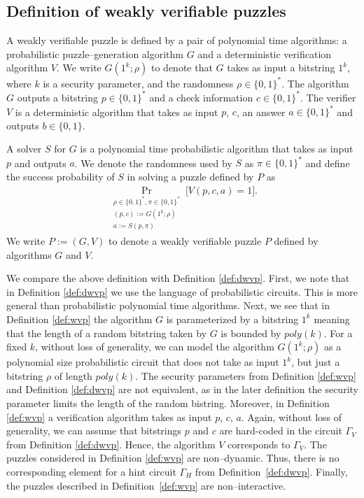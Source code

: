 \subsection{Definition of weakly verifiable puzzles}
\begin{definition}
  \label{def:wvp}
A \textnormal{weakly verifiable puzzle} is defined by a pair of polynomial time algorithms:
a probabilistic puzzle--generation algorithm $G$ and a deterministic verification algorithm $V$.
We write $G(1^k; \rho)$ to denote that $G$ takes as input a bitstring $1^k$, where $k$ is a security parameter,
and the randomness $\rho \in \{0,1\}^{*}$.
The algorithm $G$ outputs a bitstring $p \in \{0,1\}^{*}$ and a check information $c \in \{0,1\}^{*}$.
The \textnormal{verifier} $V$ is a deterministic algorithm that takes as input $p$, $c$, an answer $a \in \{0,1\}^{*}$
and outputs $b \in \{0,1\}$.

A \textnormal{solver} $S$ for $G$ is a polynomial time probabilistic algorithm that
takes as input $p$ and outputs $a$. We denote the randomness used by $S$ as $\pi \in \{0,1\}^{*}$
and define the \textnormal{success probability} of $S$ in solving a puzzle defined by $P$ as
\begin{align*}
  \underset{\substack{\rho \in \{0,1\}^{*}, \pi \in \{0,1\}^{*} \\ (p,c):=G(1^k; \rho) \\ a := S(p, \pi)}}{\Pr}\Big[ V(p,c,a) = 1\Big].
\end{align*}
We write $P := (G,V)$ to denote a weakly verifiable puzzle $P$ defined by algorithms $G$ and $V$.
\end{definition}
We compare the above definition with Definition \ref{def:dwvp}.
First, we note that in Definition \ref{def:dwvp} we use the language of probabilistic circuits.
This is more general than probabilistic polynomial time algorithms.
Next, we see that in Definition \ref{def:wvp} the algorithm $G$ is parameterized by
a bitstring $1^k$ meaning that the length of a random bitstring taken by $G$ is bounded by $poly(k)$.
For a fixed $k$, without loss of generality, we can model the algorithm $G(1^k; \rho)$ as a polynomial size probabilistic circuit
that does not take as input $1^k$, but just a bitstring $\rho$ of length $\mathit{poly}(k)$.
The security parameters from Definition \ref{def:wvp} and Definition \ref{def:dwvp} are not equivalent,
as in the later definition the security parameter limits the length of the random bistring.
Moreover, in Definition \ref{def:wvp} a verification algorithm takes as input $p$, $c$, $a$.
Again, without loss of generality, we can assume that bitstrings $p$ and $c$ are hard-coded
in the circuit $\Gamma_V$ from Definition \ref{def:dwvp}. Hence, the algorithm $V$ corresponds to $\Gamma_V$.
The puzzles considered in Definition \ref{def:wvp} are non--dynamic. Thus, there is no corresponding
element for a hint circuit $\Gamma_H$ from Definition~\ref{def:dwvp}.
Finally, the puzzles described in Definition~\ref{def:wvp} are non--interactive.

